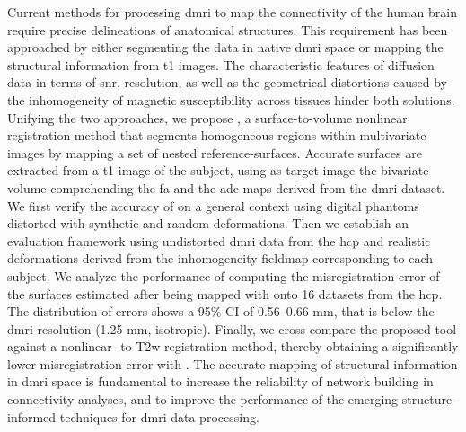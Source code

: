 Current methods for processing \gls*{dmri} to map the connectivity of the human brain
  require precise delineations of anatomical structures.
This requirement has been approached by either segmenting the data in
  native \gls*{dmri} space or mapping the structural information from \gls*{t1} images.
The characteristic features of diffusion data in terms of \acrlong*{snr}, resolution, as well
  as the geometrical distortions caused by the inhomogeneity of magnetic susceptibility
  across tissues hinder both solutions.
Unifying the two approaches, we propose \regseg{}, a surface-to-volume nonlinear
  registration method that segments homogeneous regions within multivariate images by mapping
  a set of nested reference-surfaces.
Accurate surfaces are extracted from a \gls*{t1} image of the subject, using as target image
  the bivariate volume comprehending the \gls*{fa} and the \gls*{adc} maps derived from the
  \gls*{dmri} dataset.
We first verify the accuracy of \regseg{} on a general context using digital phantoms 
  distorted with synthetic and random deformations.
Then we establish an evaluation framework using undistorted \gls*{dmri} data from the \gls*{hcp}
  and realistic deformations derived from 
  the inhomogeneity fieldmap corresponding to each subject.
We analyze the performance of \regseg{} computing the misregistration error of the surfaces estimated
  after being mapped with \regseg{} onto 16 datasets from the \gls*{hcp}.
The distribution of errors shows a 95\% CI of 0.56--0.66 mm, that is below the \gls*{dmri}
  resolution (1.25 mm, isotropic).
Finally, we cross-compare the proposed tool against a nonlinear \lowb{}-to-T2w registration
  method, thereby obtaining a significantly lower misregistration error with \regseg{}.
The accurate mapping of structural information in \gls*{dmri} space 
  is fundamental to increase the reliability of network building
  in connectivity analyses, and to improve the performance of the emerging structure-informed
  techniques for \gls*{dmri} data processing.